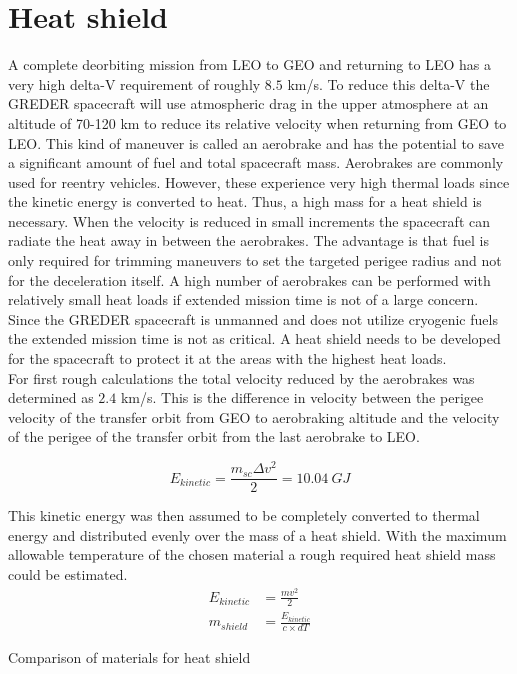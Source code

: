 \chapter{Heat shield}
\qquad A complete deorbiting mission from LEO to GEO and returning to LEO has a very high delta-V requirement of roughly $8.5$ km/s. To reduce this delta-V the GREDER spacecraft will use atmospheric drag in the upper atmosphere at an altitude of 70-120 km to reduce its relative velocity when returning from GEO to LEO. This kind of maneuver is called an aerobrake and has the potential to save a significant amount of fuel and total spacecraft mass. Aerobrakes are commonly used for reentry vehicles. However, these experience very high thermal loads since the kinetic energy is converted to heat. Thus, a high mass for a heat shield is necessary. When the velocity is reduced in small increments the spacecraft can radiate the heat away in between the aerobrakes. The advantage is that fuel is only required for trimming maneuvers to set the targeted perigee radius and not for the deceleration itself. A high number of aerobrakes can be performed with relatively small heat loads if extended mission time is not of a large concern.\\

Since the GREDER spacecraft is unmanned and does not utilize cryogenic fuels the extended mission time is not as critical. A heat shield needs to be developed for the spacecraft to protect it at the areas with the highest heat loads.\\

For first rough calculations the total velocity reduced by the aerobrakes was determined as $2.4$ km/s. This is the difference in velocity between the perigee velocity of the transfer orbit from GEO to aerobraking altitude and the velocity of the perigee of the transfer orbit from the last aerobrake to LEO.

\begin{equation}
	E_{kinetic} = \frac{m_{sc}\Delta v^2}{2} = 10.04\ GJ
\end{equation}

This kinetic energy was then assumed to be completely converted to thermal energy and distributed evenly over the mass of a heat shield. With the maximum allowable temperature of the chosen material a rough required heat shield mass could be estimated.
\begin{align}
	E_{kinetic} &= \frac{mv^2}{2}\\
	m_{shield} &=\frac{E_{kinetic}}{c\times dT}
\end{align}
\begin{table}
	
	\caption{Comparison of materials for heat shield}
\end{table}

